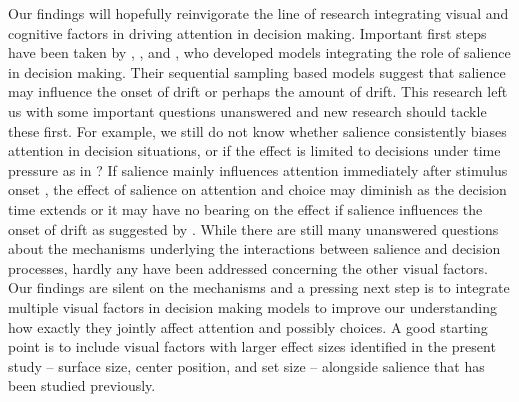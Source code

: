 \documentclass[english,natbib,man,floatsintext]{apa6}
\begin{document}
Our findings will hopefully reinvigorate the line of research integrating visual and cognitive factors in driving attention in decision making. Important first steps have been taken by \cite{chen2013}, \cite{navalpakkam2010}, and \cite{towal2013a}, who developed models integrating the role of salience in decision making. Their sequential sampling based models suggest that salience may influence the onset of drift or perhaps the amount of drift. This research left us with some important questions unanswered and new research should tackle these first. For example, we still do not know whether salience consistently biases attention in decision situations, or if the effect is limited to decisions under time pressure as in \citep{chen2013, navalpakkam2010, towal2013a, milosavljevic2012a}? If salience mainly influences attention immediately after stimulus onset \citep{theeuwes2010, orquin2015a}, the effect of salience on attention and choice may diminish as the decision time extends or it may have no bearing on the effect if salience influences the onset of drift as suggested by \cite{chen2013}. While there are still many unanswered questions about the mechanisms underlying the interactions between salience and decision processes, hardly any have been addressed concerning the other visual factors. Our findings are silent on the mechanisms and a pressing next step is to integrate multiple visual factors in decision making models to improve our understanding how exactly they jointly affect attention and possibly choices. A good starting point is to include visual factors with larger effect sizes identified in the present study -- surface size, center position, and set size -- alongside salience that has been studied previously.\\     
\end{document}
